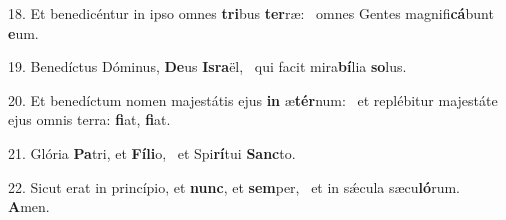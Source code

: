 18. Et benedicéntur in ipso omnes \textbf{tri}bus \textbf{ter}ræ: \ast\  omnes Gentes magnifi\textbf{cá}bunt \textbf{e}um.\

19. Benedíctus Dóminus, \textbf{De}us \textbf{Is}\textbf{ra}ël, \ast\  qui facit mira\textbf{bí}lia \textbf{so}lus.\

20. Et benedíctum nomen majestátis ejus \textbf{in} æ\textbf{tér}num: \ast\  et replébitur majestáte ejus omnis terra: \textbf{fi}at, \textbf{fi}at.\

21. Glória \textbf{Pa}tri, et \textbf{Fí}\textbf{li}o, \ast\  et Spi\textbf{rí}tui \textbf{Sanc}to.\

22. Sicut erat in princípio, et \textbf{nunc}, et \textbf{sem}per, \ast\  et in sǽcula sæcu\textbf{ló}rum. \textbf{A}men.\

